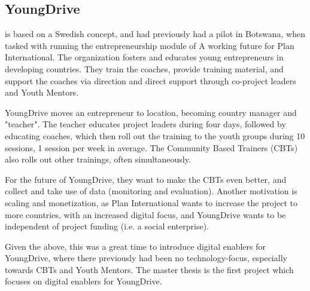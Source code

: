 \subsection{YoungDrive}

    \cite{youngdrive-web} is based on a Swedish concept, and had previously had a pilot in Botswana, when tasked with running the entrepreneurship module of A working future for Plan International. The organization fosters and educates young entrepreneurs in developing countries. They train the coaches, provide training material, and support the coaches via direction and direct support through co-project leaders and Youth Mentors.

    YoungDrive moves an entrepreneur to location, becoming country manager and "teacher". The teacher educates project leaders during four days, followed by educating coaches, which then roll out the training to the youth groups during 10 sessions, 1 session per week in average. The Community Based Trainers (CBTs) also rolls out other trainings, often simultaneously.

    For the future of YoungDrive, they want to make the CBTs even better, and collect and take use of data (monitoring and evaluation). Another motivation is scaling and monetization, as Plan International wants to increase the project to more countries, with an increased digital focus, and YoungDrive wants to be independent of project funding (i.e. a social enterprise).

    Given the above, this was a great time to introduce digital enablers for YoungDrive, where there previously had been no technology-focus, especially towards CBTs and Youth Mentors. The master thesis is the first project which focuses on digital enablers for YoungDrive.
